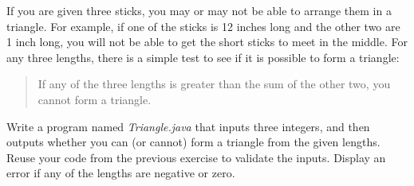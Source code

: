 \begin{exercise}  %

If you are given three sticks, you may or may not be able to arrange them in a triangle.
For example, if one of the sticks is 12 inches long and the other two are 1 inch long, you will not be able to get the short sticks to meet in the middle.
For any three lengths, there is a simple test to see if it is possible to form a triangle:

\begin{quotation}
\noindent
If any of the three lengths is greater than the sum of the other two, you cannot form a triangle.
\end{quotation}

Write a program named {\it Triangle.java} that inputs three integers, and then outputs whether you can (or cannot) form a triangle from the given lengths.
Reuse your code from the previous exercise to validate the inputs.
Display an error if any of the lengths are negative or zero.

\end{exercise}
